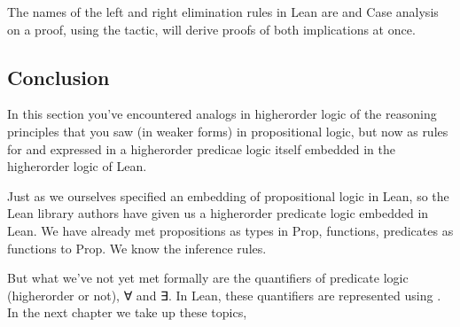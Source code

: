 \documentclass[letterpaper,10pt,english]{sphinxmanual}
\begin{document}
\sphinxAtStartPar
The names of the  left and right elimination rules in
Lean are  and  Case analysis on a proof,
 using the  tactic, will derive proofs of
both implications at once.

\begin{sphinxVerbatim}[commandchars=\\\{\}]
                 

 
    
   

 
    
   
\end{sphinxVerbatim}


\subsection{Conclusion}
\label{\detokenize{A_02_Constructive_Logic:conclusion}}
\sphinxAtStartPar
In this section you’ve encountered analogs in
higher\sphinxhyphen{}order logic of the reasoning principles
that you saw (in weaker forms) in propositional
logic, but now as rules for and expressed in a
higher\sphinxhyphen{}order predicae logic itself embedded in
the higher\sphinxhyphen{}order logic of Lean.

\sphinxAtStartPar
Just as we ourselves specified an embedding
of propositional logic in Lean, so the Lean
library authors have given us a higher\sphinxhyphen{}order
predicate logic embedded in Lean. We have
already met propositions as types in Prop,
functions, predicates as functions to Prop.
We know the inference rules.

\sphinxAtStartPar
But what we’ve not yet met formally are the
quantifiers of predicate logic (higher\sphinxhyphen{}order or
not), ∀ and ∃. In Lean, these quantifiers are
represented using . In the
next chapter we take up these topics,
\end{document}
